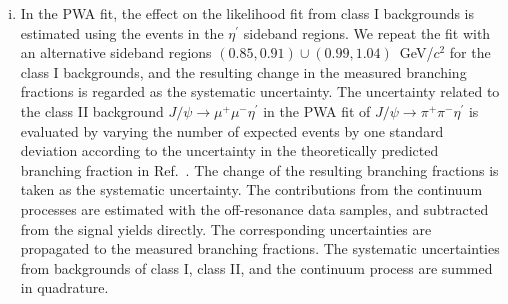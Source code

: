\documentclass[twocolumn,showpacs,aps,prd]{revtex4-1}
\newcommand{\etap}{\eta^{\prime}}
\begin{document}
\begin{enumerate}[(i)]
  \item In the PWA fit, the effect on the likelihood fit from class I backgrounds is estimated using the events in the $\etap$ sideband regions. We repeat the fit with an alternative sideband regions $(0.85, 0.91) \cup (0.99, 1.04)$~GeV/$c^2$ for the class I backgrounds, and the resulting change in the measured branching fractions is regarded as the systematic uncertainty. The uncertainty related to the class II background
  $J/\psi\to \mu^+\mu^-\eta^\prime$ in the PWA fit of $J/\psi\to \pi^+\pi^-\eta^\prime$ is evaluated by varying the number
  of expected events by one standard deviation according to the uncertainty in the theoretically predicted branching fraction in Ref.~\cite{jpsidimu}.
  The change of the resulting branching fractions is taken as the systematic uncertainty. The contributions from the continuum processes are estimated with the off-resonance data samples, and subtracted from the signal yields directly. The corresponding uncertainties are propagated to the measured branching fractions. The systematic uncertainties from backgrounds of class I, class II, and the continuum process are summed in quadrature.
\end{enumerate}
%
\end{document}
